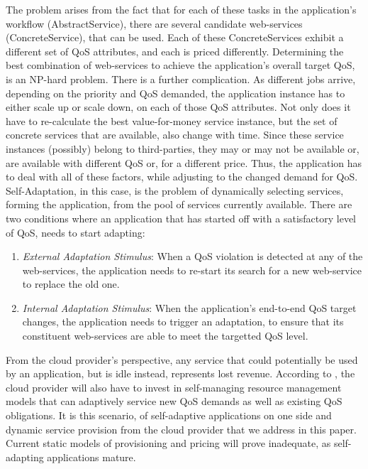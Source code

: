 \documentclass[10pt,journal,compsoc]{IEEEtran}
\begin{document}
The problem arises from the fact that for each of these tasks in the application's workflow (AbstractService), there are several candidate web-services (ConcreteService), that can be used. Each of these ConcreteServices exhibit a different set of QoS attributes, and each is priced differently. Determining the best combination of web-services to achieve the application's overall target QoS, is an NP-hard problem\cite{Ardagna2005Global}. There is a further complication. As different jobs arrive, depending on the priority and QoS demanded, the application instance has to either scale up or scale down, on each of those QoS attributes. Not only does it have to re-calculate the best value-for-money service instance, but the set of concrete services that are available, also change with time. Since these service instances (possibly) belong to third-parties, they may or may not be available or, are available with different QoS or, for a different price. Thus, the application has to deal with all of these factors, while adjusting to the changed demand for QoS.  Self-Adaptation, in this case, is the problem of dynamically selecting services, forming the application, from the pool of services currently available. There are two conditions where an application that has started off with a satisfactory level of QoS, needs to start adapting:
	\begin{enumerate}
	    \item \textit{External Adaptation Stimulus}: When a QoS violation is detected at any of the web-services, the application needs to re-start its search for a new web-service to replace the old one.
	     \item \textit{Internal Adaptation Stimulus}: When the application's end-to-end QoS target changes, the application needs to trigger an adaptation, to ensure that its constituent web-services are able to meet the targetted QoS level.
	\end{enumerate} 
From the cloud provider's perspective, any service that could potentially be used by an application, but is idle instead, represents lost revenue. According to \cite{Buyya2008Market-Oriented}, the cloud provider will also have to invest in self-managing resource management models that can adaptively service new QoS demands as well as existing QoS obligations. It is this scenario, of self-adaptive applications on one side and dynamic service provision from the cloud provider that we address in this paper. Current static models of provisioning and pricing will prove inadequate, as self-adapting applications mature.
  
\end{document}
